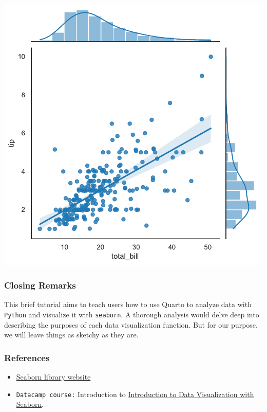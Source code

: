 \documentclass[
  letterpaper,
  DIV=11,
  numbers=noendperiod]{scrartcl}
\begin{document}
\includegraphics{data_visualization_with_seaborn_files/figure-pdf/cell-23-output-1.pdf}

\hypertarget{closing-remarks}{%
\subsubsection{Closing Remarks}\label{closing-remarks}}

This brief tutorial aims to teach users how to use Quarto to analyze
data with \texttt{Python} and visualize it with \texttt{seaborn}. A
thorough analysis would delve deep into describing the purposes of each
data visualization function. But for our purpose, we will leave things
as sketchy as they are.

\hypertarget{references}{%
\subsubsection{References}\label{references}}

\begin{itemize}
\item
  \href{https://seaborn.pydata.org/}{Seaborn library website}
\item
  \texttt{Datacamp\ course:} Introduction to
  \href{https://www.datacamp.com/courses/introduction-to-data-visualization-with-seaborn}{Introduction
  to Data Visualization with Seaborn}.
\end{itemize}
\end{document}
